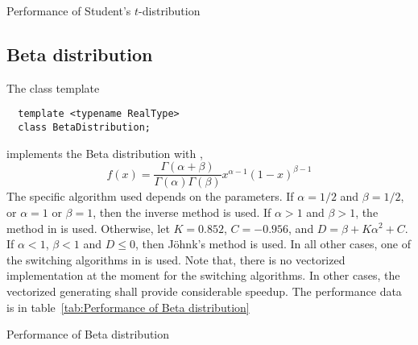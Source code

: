 \begin{table}
  \caption{Performance of Student's $t$-distribution}
  \label{tab:Performance of Student's t-distribution}
\end{table}

\subsection{Beta distribution}
\label{sub:Beta distribution}

The class template
\begin{Verbatim}
  template <typename RealType>
  class BetaDistribution;
\end{Verbatim}
implements the Beta distribution with \pdf,
\begin{equation*}
  f(x) = \frac{\Gamma(\alpha + \beta)}{\Gamma(\alpha)\Gamma(\beta)}
  x^{\alpha - 1}(1 - x)^{\beta - 1}
\end{equation*}
The specific algorithm used depends on the parameters. If $\alpha = 1/2$ and
$\beta = 1/2$, or $\alpha = 1$ or $\beta = 1$, then the inverse method is used.
If $\alpha > 1$ and $\beta > 1$, the method in \textcite{Cheng:1978jl} is used.
Otherwise, let $K = 0.852$, $C = -0.956$, and $D = \beta + K\alpha^2 + C$. If
$\alpha < 1$, $\beta < 1$ and $D \le 0$, then Jöhnk's method
\parencite[sec.~3.5]{Devroye:1986gi} is used. In all other cases, one of the
switching algorithms in \textcite{Atkinson:1979es} is used. Note that, there is
no vectorized implementation at the moment for the switching algorithms. In
other cases, the vectorized generating shall provide considerable speedup. The
performance data is in table~\ref{tab:Performance of Beta distribution}

\begin{table}
  \caption{Performance of Beta distribution}
  \label{tab:Performance of Beta distribution}
\end{table}

